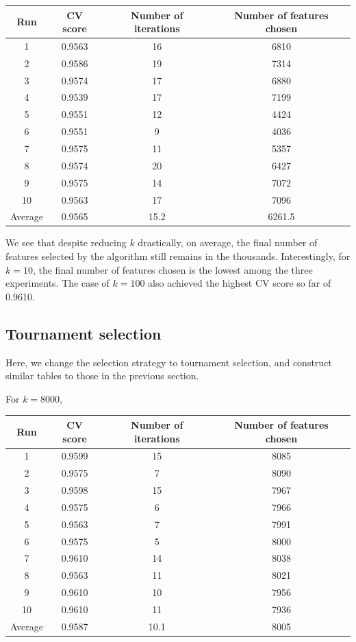 \documentclass[12pt, twoside, a4paper]{report}
\begin{document}
\begin{center}
    \begin{tabular}{| c | c | c | c | } \hline
    Run & CV score & Number of iterations & Number of features chosen \\ \hline \hline
    1 & 0.9563 & 16 & 6810 \\ \hline
	2 & 0.9586  & 19 & 7314 \\ \hline
	3 & 0.9574 & 17 & 6880 \\ \hline
	4 & 0.9539 & 17 & 7199 \\ \hline
	5 & 0.9551 & 12 & 4424 \\ \hline
	6 & 0.9551 & 9 & 4036 \\ \hline
	7 & 0.9575 & 11 & 5357 \\ \hline
	8 & 0.9574 & 20 & 6427 \\ \hline
	9 & 0.9575 & 14 & 7072 \\ \hline
	10 & 0.9563 & 17 & 7096 \\ \hline
	Average & 0.9565 & 15.2 & 6261.5 \\ \hline
    \end{tabular}
\end{center}

We see that despite reducing $k$ drastically, on average, the final number of features selected by the algorithm still remains in the thousands. Interestingly, for $k=10$, the final number of features chosen is the lowest among the three experiments. The case of $k=100$ also achieved the highest CV score so far of 0.9610.

\subsection{Tournament selection}

Here, we change the selection strategy to tournament selection, and construct similar tables to those in the previous section.

For $k=8000$,
\begin{center}
    \begin{tabular}{| c | c | c | c | } \hline
    Run & CV score & Number of iterations & Number of features chosen \\ \hline \hline
    1 & 0.9599 & 15 & 8085 \\ \hline
	2 & 0.9575  & 7 & 8090 \\ \hline
	3 & 0.9598 & 15 & 7967 \\ \hline
	4 & 0.9575 & 6 & 7966 \\ \hline
	5 & 0.9563 & 7 & 7991 \\ \hline
	6 & 0.9575 & 5 & 8000 \\ \hline
	7 & 0.9610 & 14 & 8038 \\ \hline
	8 & 0.9563 & 11 & 8021 \\ \hline
	9 & 0.9610 & 10 & 7956 \\ \hline
	10 & 0.9610 & 11 & 7936 \\ \hline
	Average & 0.9587 & 10.1 & 8005 \\ \hline
    \end{tabular}
\end{center}
\end{document}
